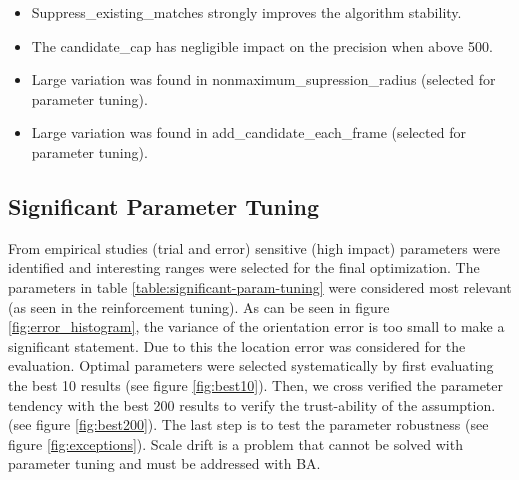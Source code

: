 \begin{itemize}
    \item Suppress\_existing\_matches strongly improves the algorithm stability.
    \item The candidate\_cap has negligible impact on the precision when above 500.
    \item Large variation was found in nonmaximum\_supression\_radius (selected for parameter tuning).
    \item Large variation was found in add\_candidate\_each\_frame (selected for parameter tuning).
\end{itemize}

\subsection{Significant Parameter Tuning}  
From empirical studies (trial and error) sensitive (high impact) parameters were identified and interesting ranges were selected for the final optimization. 
The parameters in table \ref{table:significant-param-tuning} were considered most relevant (as seen in the reinforcement tuning). 
As can be seen in figure \ref{fig:error_histogram}, the variance of the orientation error is too small to make a significant statement.
Due to this the location error was considered for the evaluation.
Optimal parameters were selected systematically by first evaluating the best 10 results (see figure \ref{fig:best10}).
Then, we cross verified the parameter tendency with the best 200 results to verify the trust-ability of the assumption. (see figure \ref{fig:best200}). The last step is to test the parameter robustness (see figure \ref{fig:exceptions}). 
Scale drift is a problem that cannot be solved with parameter tuning and must be addressed with BA.

